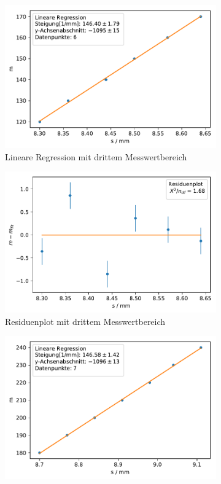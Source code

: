 \documentclass[12pt,a4paper]{article}
\begin{document}
\begin{figure}[H]
\begin{subfigure}{0.49\textwidth}
		\includegraphics[width=\linewidth]{Python/Uebersetzungsfaktor3_LinReg.pdf}
		\caption{Lineare Regression mit drittem Messwertbereich}
		\label{k3LinReg}
	\end{subfigure}
	\begin{subfigure}{0.49\textwidth}
		\centering
		\includegraphics[width=\linewidth]{Python/Uebersetzungsfaktor3_Residuen.pdf}
		\caption{Residuenplot mit drittem Messwertbereich}
		\label{k3ResPlot}
	\end{subfigure}
	\begin{subfigure}{0.49\textwidth}
		\centering
		\includegraphics[width=\linewidth]{Python/Uebersetzungsfaktor4_LinReg.pdf}

\end{subfigure}
\end{figure}
\end{document}
